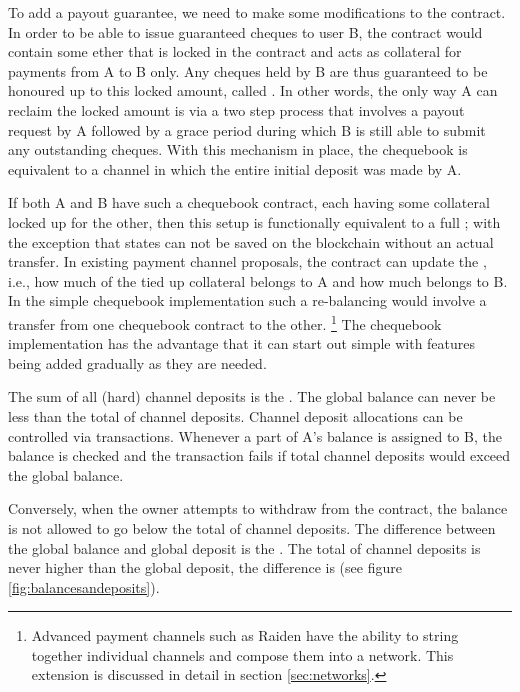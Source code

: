 To add a payout guarantee, we need to make some modifications to the contract. In order to be able to issue guaranteed cheques to user B, the contract would contain some ether that is locked in the contract and acts as collateral for payments from A to B only. Any cheques held by B are thus guaranteed to be honoured up to this locked amount, called . In other words, the only way A can reclaim the locked amount is via a two step process that involves a payout request by A followed by a grace period during which B is still able to submit any outstanding cheques. With this mechanism in place, the chequebook is equivalent to a channel in which the entire initial deposit was made by A. 

If both A and B have such a chequebook contract, each having some collateral locked up for the other, then this setup is functionally equivalent to a full ; with the exception that states can not be saved on the blockchain without an actual transfer. In existing payment channel proposals, the contract can update the , i.e., how much of the tied up collateral belongs to A and how much belongs to B. In the simple chequebook implementation such a re-balancing would involve a transfer from one chequebook contract to the other.%
%
\footnote{Advanced payment channels such as Raiden \cite{citation-needed:Raiden} have the ability to string together individual channels and compose them into a network. This extension is discussed in detail in section \ref{sec:networks}.}
%
The chequebook implementation has the advantage that it can start out simple with features being added gradually as they are needed.

The sum of all (hard) channel deposits is the . The global balance can never be less than the total of channel deposits. Channel deposit allocations can be controlled via transactions. Whenever a part of A's balance is assigned to B, the balance is checked and the transaction fails if total channel deposits would exceed the global balance.

Conversely, when the owner attempts to withdraw from the contract, the balance is not allowed to go below the total of channel deposits. 
The difference between the global balance and global deposit is the . The total of channel deposits is never higher than the global deposit, the difference is  (see figure \ref{fig:balancesandeposits}).


